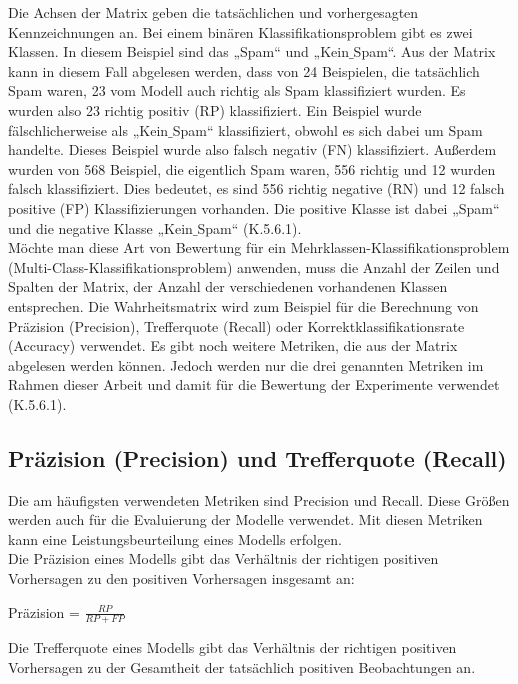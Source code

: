 \documentclass[12pt]{scrreprt}
\begin{document}
Die Achsen der Matrix geben die tatsächlichen und vorhergesagten Kennzeichnungen an. Bei einem binären Klassifikationsproblem gibt es zwei Klassen. In diesem Beispiel sind das „Spam“ und „Kein$\_$Spam“.  Aus der Matrix kann in diesem Fall abgelesen werden, dass von 24 Beispielen, die tatsächlich Spam waren, 23 vom Modell auch richtig als Spam klassifiziert wurden. Es wurden also 23 richtig positiv (RP) klassifiziert. Ein Beispiel wurde fälschlicherweise als „Kein$\_$Spam“ klassifiziert, obwohl es sich dabei um Spam handelte. Dieses Beispiel wurde also falsch negativ (FN) klassifiziert. Außerdem wurden von 568 Beispiel, die eigentlich Spam waren, 556 richtig und 12 wurden falsch klassifiziert. Dies bedeutet, es sind 556 richtig negative (RN) und 12 falsch positive (FP) Klassifizierungen vorhanden. Die positive Klasse ist dabei „Spam“ und die negative Klasse „Kein$\_$Spam“ \cite{Burkov2019} (K.5.6.1). \\

Möchte man diese Art von Bewertung für ein Mehrklassen-Klassifikationsproblem (Multi-Class-Klassifikationsproblem) anwenden, muss die Anzahl der Zeilen und Spalten der Matrix, der Anzahl der verschiedenen vorhandenen Klassen entsprechen. Die Wahrheitsmatrix wird zum Beispiel für die Berechnung von Präzision (Precision), Trefferquote (Recall) oder Korrektklassifikationsrate (Accuracy) verwendet. Es gibt noch weitere Metriken, die aus der Matrix abgelesen werden können. Jedoch werden nur die drei genannten Metriken im Rahmen dieser Arbeit und damit für die Bewertung der Experimente verwendet \cite{Burkov2019} (K.5.6.1).  

\subsection{Präzision (Precision) und Trefferquote (Recall)} 

Die am häufigsten verwendeten Metriken sind Precision und Recall. Diese Größen werden auch für die Evaluierung der Modelle verwendet. Mit diesen Metriken kann eine Leistungsbeurteilung eines Modells erfolgen.  \\

Die Präzision eines Modells gibt das Verhältnis der richtigen positiven Vorhersagen zu den positiven Vorhersagen insgesamt an: 

\begin{center}
	Präzision = $\frac{RP}{RP + FP}$
\end{center}
 
Die Trefferquote eines Modells gibt das Verhältnis der richtigen positiven Vorhersagen zu der Gesamtheit der tatsächlich positiven Beobachtungen an.  
\end{document}

